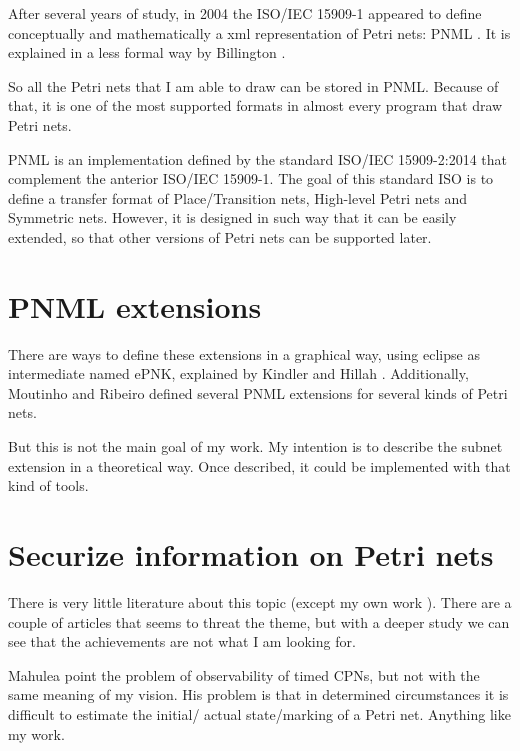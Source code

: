 After several years of study, in 2004 the ISO/IEC 15909-1  \cite{PNML-iso/iec-15909-1} appeared to define conceptually and mathematically a xml representation
of Petri nets: PNML \cite{PNML-Hillah2006307}.  It is explained in a less formal way by Billington \cite{PNML-Billington2003483}. 


So all the Petri nets that I am able to draw can be stored in PNML. Because
of that, it is one of the most supported formats in almost every program that
draw Petri nets. 

PNML \cite{PNML-pnml.org} is an implementation defined by the standard ISO/IEC 15909-2:2014 \cite{PNML-iso/iec-15909-2:2011} that complement the anterior
ISO/IEC 15909-1. The goal of this standard ISO is to define a transfer format of Place/Transition nets, High-level Petri nets and Symmetric nets. However, it is designed in
such way that it can be easily extended, so that other versions of Petri
nets can be supported later.

 


\section{PNML extensions}

There are ways to define these extensions in a graphical way, using eclipse
as intermediate named ePNK, explained by Kindler \cite{PNMLE-Kindler2011318} and Hillah
\cite{PNMLE-Hillah201246}. Additionally, Moutinho \cite{PNMLE-Moutinho20102156} and Ribeiro \cite{PNMLE-Ribeiro2011777} defined several PNML extensions for several kinds of Petri nets.

But this is not the main goal of my work. My intention is to describe the subnet extension in a theoretical way. Once described, it could be implemented with that kind of tools.



\section{Securize information on Petri nets}

There is very little literature about this topic (except my own work \cite{HID-Inigo2011MT}).
There are a couple of articles that seems to threat the theme, but with a deeper study we can see that the achievements are not what I am looking for.

Mahulea \cite{HID-Mahulea2013387} point the problem of observability of timed CPNs, but not with the same meaning of my vision. His problem is that
in determined circumstances  it is difficult to estimate the initial/ actual state/marking
of a Petri net. Anything like my work. 

